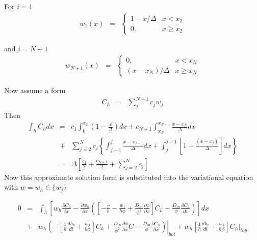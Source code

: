 For $i=1$
\begin{eqnarray}
w_1(x) & = & \left\{ \begin{array}{ll}
1 - x/\Delta & x < x_{2} \\
0, & x \geq x_{2} 
\end{array}
\right.
\end{eqnarray}

and $i = N+1$
\begin{eqnarray}
w_{N+1}(x) & = & \left\{ \begin{array}{ll}
0, & x < x_{N} \\
(x-x_{N})/\Delta & x \geq x_{N}
\end{array}
\right.
\end{eqnarray}

Now assume a form
\begin{eqnarray}
C_h & = &  \sum_j^{N+1} c_j w_j
\end{eqnarray}
Then 
\begin{eqnarray}
\int_h C_h dx & = & c_1\int_0^{x_{2}}\left(1-\frac{x}{\Delta}\right)dx
  +  c_{N+1}\int_{x_N}^{x_{N+1}}\frac{x-x_{N}}{\Delta}dx  \nonumber \\
& + &
  \sum_{j=2}^{N}c_j\left\{\int_{j-1}^{j}\frac{x-x_{j-1}}{\Delta}dx +
    \int_{j}^{j+1}\left[1 - \frac{(x-x_j)}{\Delta}\right]dx\right\}
  \nonumber \\
& = & \Delta \left[\frac{c_1}{2} + \frac{c_{N+1}}{2} + \sum_{j = 2}^{N}c_{j}\right]
\end{eqnarray}
Now this approximate solution form is substituted into the variational equation
with $w = w_h \in \{w_j\}$

\begin{eqnarray}
0 &= & \int_{h}\left[ w_h\frac{\partial C_h}{\partial t} -   \frac{\partial
    w_h}{\partial x} \left(\left[-\frac{v}{h} - \frac{w_f}{h\phi}+ \frac{D_{in}}{\phi^2}\frac{\partial
      \phi}{\partial x}\right]C_h  -  \frac{D_{in}}{\phi}\frac{\partial C_h}{\partial
      x} \right) \right]dx \nonumber \\
& + &  w_h\left.\left(
    -\left[\frac{1}{h}\frac{dh_b}{dt}+  \frac{w_f}{h\phi}\right]C_h + \frac{D_{in}}{\phi^2}\frac{\partial \phi}{\partial
    x}C -\frac{D_{in}}{\phi}\frac{\partial C_h}{\partial
    x}\right)\right|_{bot} + w_h\left[\frac{1}{h}\frac{dh_t}{dt} +
\frac{w_f}{h\phi}\right]C_h|_{top} \nonumber
\end{eqnarray}

